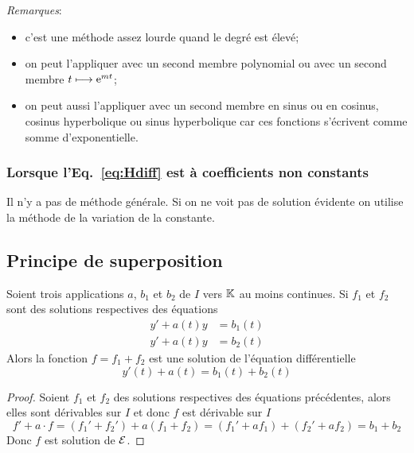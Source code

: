 \emph{Remarques}:
\begin{itemize}
\item c'est une méthode assez lourde quand le degré est élevé;
\item on peut l'appliquer avec un second membre polynomial ou avec un second membre $t \longmapsto \operatorname{e}^{mt}$;
\item on peut aussi l'appliquer avec un second membre en sinus ou en cosinus, cosinus hyperbolique ou sinus hyperbolique car ces fonctions s'écrivent comme somme d'exponentielle.
\end{itemize}
\subsubsection{Lorsque l'Eq.~\eqref{eq:Hdiff} est à coefficients non constants}
\label{subsubsec:recherchesolutionpart-coefnnconstants}
Il n'y a pas de méthode générale. Si on ne voit pas de solution \og évidente \fg{} on utilise la méthode de la variation de la constante.
%
\subsection{Principe de superposition}
\label{subsec:principesuperposition}
\begin{prop}
  Soient trois applications $a$, $b_1$ et $b_2$ de $I$ vers $\mathbb{K}$ au moins continues. Si $f_1$ et $f_2$ sont des solutions respectives des équations
  \begin{align}
    y'+a(t)y&=b_1(t)\\ y'+a(t)y&=b_2(t)
  \end{align}
Alors la fonction $f=f_1+f_2$ est une solution de l'équation différentielle 
\begin{equation}
  y'(t)+a(t)=b_1(t)+b_2(t)
\end{equation}
\end{prop}
\begin{proof}
  Soient $f_1$ et $f_2$ des solutions respectives des équations précédentes, alors elles sont dérivables sur $I$ et donc $f$ est dérivable sur $I$
  \begin{equation}
    f'+a \cdot f=(f_1' + f_2')+a(f_1+f_2)=(f_1'+af_1)+(f_2'+af_2)=b_1+b_2
  \end{equation}
Donc $f$ est solution de $\mathcal{E}$.
\end{proof}
%
